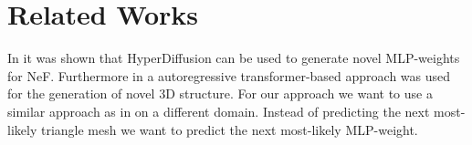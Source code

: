 \section{Related Works}
\label{sec:literature}
In \cite{erkoç2023hyperdiffusion} it was shown that HyperDiffusion can be
used to generate novel MLP-weights for NeF. Furthermore in \cite{siddiqui2023meshgpt} a autoregressive transformer-based approach
was used for the generation of novel 3D structure. For our approach we want to use a similar approach
as in \cite{siddiqui2023meshgpt} on a different domain. Instead of predicting the next most-likely triangle mesh we want to
predict the next most-likely MLP-weight.

